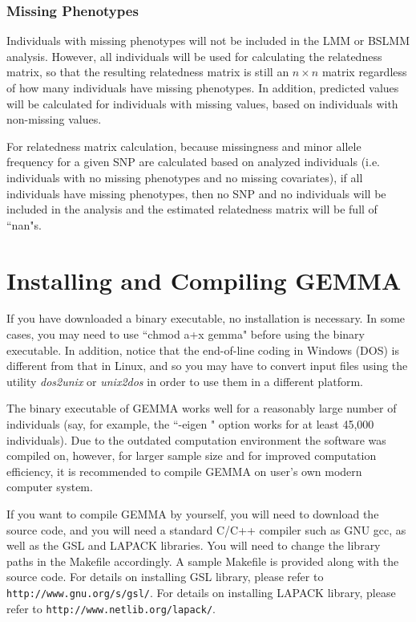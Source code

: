 \documentclass[11pt]{article}
\providecommand{\url}[1]{\texttt{#1}}
\begin{document}
\subsubsection{Missing Phenotypes}

Individuals with missing phenotypes will not be included in the LMM or
BSLMM analysis. However, all individuals will be used for calculating
the relatedness matrix, so that the resulting relatedness matrix is
still an $n\times n$ matrix regardless of how many individuals have
missing phenotypes. In addition, predicted values will be calculated
for individuals with missing values, based on individuals with
non-missing values.

For relatedness matrix calculation, because missingness and minor
allele frequency for a given SNP are calculated based on analyzed
individuals (i.e. individuals with no missing phenotypes and no
missing covariates), if all individuals have missing phenotypes, then
no SNP and no individuals will be included in the analysis and the
estimated relatedness matrix will be full of ``nan"s.

\newpage

\section{Installing and Compiling GEMMA}

If you have downloaded a binary executable, no installation is
necessary. In some cases, you may need to use ``chmod a+x gemma"
before using the binary executable. In addition, notice that the
end-of-line coding in Windows (DOS) is different from that in Linux,
and so you may have to convert input files using the utility {\it
  dos2unix} or {\it unix2dos} in order to use them in a different
platform.

The binary executable of GEMMA works well for a reasonably large
number of individuals (say, for example, the ``-eigen " option works
for at least 45,000 individuals). Due to the outdated computation
environment the software was compiled on, however, for larger sample
size and for improved computation efficiency, it is recommended to
compile GEMMA on user's own modern computer system.

If you want to compile GEMMA by yourself, you will need to download
the source code, and you will need a standard C/C++ compiler such as
GNU gcc, as well as the GSL and LAPACK libraries. You will need to
change the library paths in the Makefile accordingly. A sample
Makefile is provided along with the source code. For details on
installing GSL library, please refer to
\url{http://www.gnu.org/s/gsl/}. For details on installing LAPACK
library, please refer to \url{http://www.netlib.org/lapack/}.
\end{document}
